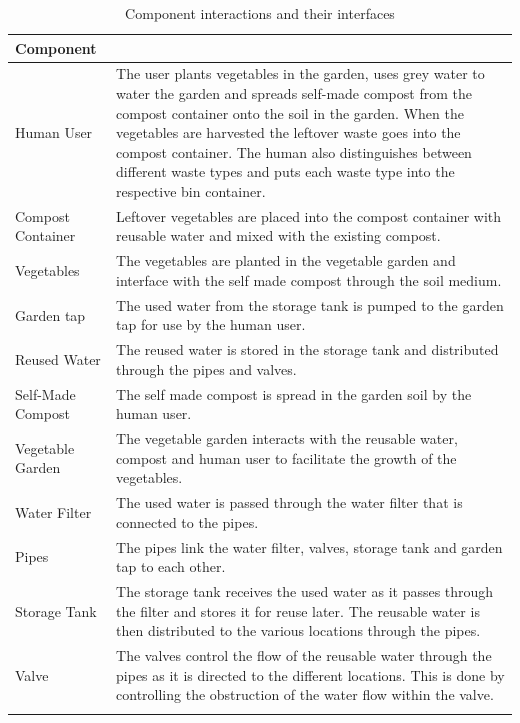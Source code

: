 \documentclass[a4paper,11pt,fleqn]{report}
\begin{document}
\begin{table}[h!]
\caption {Component interactions and their interfaces} \label{tb: Components & interfaces} 
\begin{center}
\begin{tabular}{p{4cm}|p{8cm}}\toprule
	{\textbf{Component}} & {\textbf{Interactions and Interfaces}\\ \midrule
    Human User & The user plants vegetables in the garden, uses grey water to water the garden and spreads self-made compost from the compost container onto the soil in the garden. When the vegetables are harvested the leftover waste goes into the compost container. The human also distinguishes between different waste types and puts each waste type into the respective bin container.\\
    \hline
    Compost Container & Leftover vegetables are placed into the compost container with reusable water and mixed with the existing compost.\\
        \hline
    Vegetables & The vegetables are planted in the vegetable garden and interface with the self made compost through the soil medium.\\
        \hline
    Garden tap & The used water from the storage tank is pumped to the garden tap for use by the human user. \\
        \hline
    Reused Water & The reused water is stored in the storage tank and distributed through the pipes and valves.\\
        \hline
    Self-Made Compost & The self made compost is spread in the garden soil by the human user.\\
         \hline
    Vegetable Garden & The vegetable garden interacts with the reusable water, compost and human user to facilitate the growth of the vegetables.\\
         \hline
    Water Filter & The used water is passed through the water filter that is connected to the pipes.\\
             \hline
    Pipes & The pipes link the water filter, valves, storage tank and garden tap to each other.\\
             \hline
    Storage Tank & The storage tank receives the used water as it passes through the filter and stores it for reuse later. The reusable water is then distributed to the various locations through the pipes. \\
             \hline
    Valve & The valves control the flow of the reusable water through the pipes as it is directed to the different locations. This is done by controlling the obstruction of the water flow within the valve.\\
}
\end{tabular}
\end{center}
\end{table}
\end{document}
